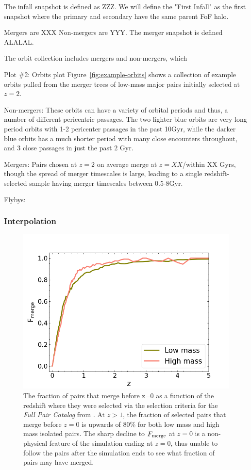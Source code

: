 \documentclass[twocolumn]{aastex631}
\newcommand{\paircat}{\textit{Full Pair Catalog}}
\begin{document}
The infall snapshot is defined as ZZZ. 
We will define the "First Infall" as the first snapshot where the primary and secondary have the same parent FoF halo. 

Mergers are XXX 
Non-mergers are YYY. 
The merger snapshot is defined ALALAL.

The orbit collection includes mergers and non-mergers, which 

Plot \#2: Orbits plot
Figure~\ref{fig:example-orbits} shows a collection of example orbits pulled from the merger trees of low-mass major pairs initially selected at $z=2$. 

 Non-mergers: These orbits can have a variety of orbital periods and thus, a number of different pericentric passages. The two lighter blue orbits are very long period orbits with 1-2 pericenter passages in the past 10Gyr, while the darker blue orbits has a much shorter period with many close encounters throughout, and 3 close passages in just the past 2 Gyr.

Mergers:  Pairs chosen at $z=2$ on average merge at $z=XX$/within XX Gyrs, though the spread of merger timescales is large, leading to a single redshift-selected sample having merger timescales between 0.5-8Gyr.

Flybys:

\subsubsection{Interpolation}
\begin{figure}[htb]
    \begin{center}
    \includegraphics[width=\columnwidth]{plots/bet-on-it/1_fmerge_comp.png}
    \caption{The fraction of pairs that merge before z=0 as a function of the redshift where they were selected via the selection criteria for the \paircat{} from \citet{Chamberlain2024}. At $z>1$, the fraction of selected pairs that merge before $z=0$ is upwards of 80\% for both low mass and high mass isolated pairs. The sharp decline to $F_{\rm merge}$ at $z=0$ is a non-physical feature of the simulation ending at $z=0$, thus unable to follow the pairs after the simulation ends to see what fraction of pairs may have merged.}
    \label{fig:fmerge}
    \end{center}
\end{figure}
\end{document}
